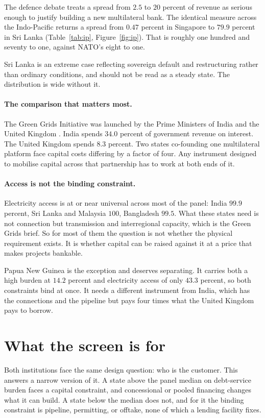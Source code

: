 \documentclass[10pt,twocolumn]{article}
\begin{document}
The defence debate treats a spread from $2.5$ to $20$ percent of revenue as
serious enough to justify building a new multilateral bank. The identical measure
across the Indo-Pacific returns a spread from $0.47$ percent in Singapore to
$79.9$ percent in Sri Lanka (Table~\ref{tab:ip}, Figure~\ref{fig:ip}). That is
roughly one hundred and seventy to one, against NATO's eight to one.

Sri Lanka is an extreme case reflecting sovereign default and restructuring rather
than ordinary conditions, and should not be read as a steady state. The
distribution is wide without it.

\paragraph{The comparison that matters most.} The Green Grids Initiative was
launched by the Prime Ministers of India and the United Kingdom \cite{ggi}. India
spends $34.0$ percent of government revenue on interest. The United Kingdom spends
$8.3$ percent. Two states co-founding one multilateral platform face capital costs
differing by a factor of four. Any instrument designed to mobilise capital across
that partnership has to work at both ends of it.

\paragraph{Access is not the binding constraint.} Electricity access is at or near
universal across most of the panel: India $99.9$ percent, Sri Lanka and Malaysia
$100$, Bangladesh $99.5$. What these states need is not connection but transmission
and interregional capacity, which is the Green Grids brief. So for most of them the
question is not whether the physical requirement exists. It is whether capital can
be raised against it at a price that makes projects bankable.

Papua New Guinea is the exception and deserves separating. It carries both a high
burden at $14.2$ percent and electricity access of only $43.3$ percent, so both
constraints bind at once. It needs a different instrument from India, which has
the connections and the pipeline but pays four times what the United Kingdom pays
to borrow.

\section{What the screen is for}

Both institutions face the same design question: who is the customer. This answers
a narrow version of it. A state above the panel median on debt-service burden
faces a capital constraint, and concessional or pooled financing changes what it
can build. A state below the median does not, and for it the binding constraint is
pipeline, permitting, or offtake, none of which a lending facility fixes.
\end{document}
